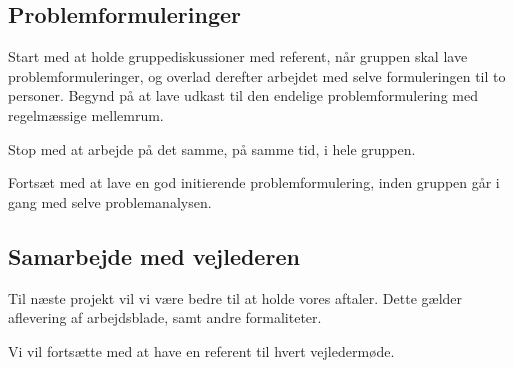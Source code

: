 \documentclass[a4paper,12pt,oneside,article]{memoir}
\begin{document}
    

    \subsection{Problemformuleringer}

        Start med at holde gruppediskussioner med referent, når gruppen skal lave problemformuleringer, og overlad derefter arbejdet med selve formuleringen til to personer.
        Begynd på at lave udkast til den endelige problemformulering med regelmæssige mellemrum.

        Stop med at arbejde på det samme, på samme tid, i hele gruppen.

        Fortsæt med at lave en god initierende problemformulering, inden gruppen går i gang med selve problemanalysen.


    \subsection{Samarbejde med vejlederen}

    Til næste projekt vil vi være bedre til at holde vores aftaler. Dette gælder aflevering af arbejdsblade, samt andre formaliteter.

    Vi vil fortsætte med at have en referent til hvert vejledermøde.

\end{document}
